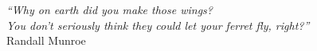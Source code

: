 \cleardoublepage
\thispagestyle{plain}

\vspace*{8cm}

\begin{flushright}
   \textsl{``Why on earth did you make those wings?\\ You don't seriously think they could let your ferret fly, right?''} \\
\vspace*{1.5cm}
           Randall Munroe
\end{flushright}
